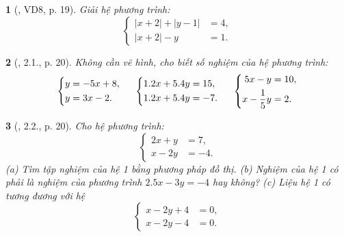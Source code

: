 \documentclass{article}
\newtheorem{baitoan}{}
\begin{document}
\begin{baitoan}[\cite{Binh_boi_duong_Toan_9_tap_2}, VD8, p. 19]
	Giải hệ phương trình:
	\begin{equation*}
		\left\{\begin{split}
			|x + 2| + |y - 1| &= 4,\\
			|x + 2| - y &= 1.
		\end{split}\right.
	\end{equation*}
\end{baitoan}

\begin{baitoan}[\cite{Binh_boi_duong_Toan_9_tap_2}, 2.1., p. 20]
	Không cần vẽ hình, cho biết số nghiệm của hệ phương trình:
	\begin{equation*}
		\left\{\begin{split}
			y &= -5x + 8,\\
			y &= 3x - 2.
		\end{split}\right.\hspace{5mm}
		\left\{\begin{split}
			1.2x + 5.4y &= 15,\\
			1.2x + 5.4y &= -7.
		\end{split}\right.\hspace{5mm}
		\left\{\begin{split}
		5x - y &= 10,\\
		x - \frac{1}{5}y &= 2.
		\end{split}\right.
	\end{equation*}
\end{baitoan}

\begin{baitoan}[\cite{Binh_boi_duong_Toan_9_tap_2}, 2.2., p. 20]
	Cho hệ phương trình:
	\begin{equation*}
		\left\{\begin{split}
			2x + y &= 7,\\
			x - 2y &= -4.
		\end{split}\right.
	\end{equation*}
	(a) Tìm tập nghiệm của hệ 1 bằng phương pháp đồ thị. (b) Nghiệm của hệ 1 có phải là nghiệm của phương trình $2.5x - 3y = -4$ hay không? (c) Liệu hệ 1 có tương đương với hệ
	\begin{equation*}
		\left\{\begin{split}
			x - 2y + 4 &= 0,\\
			x - 2y - 4 &= 0.
		\end{split}\right.
	\end{equation*}
\end{baitoan}
\end{document}
